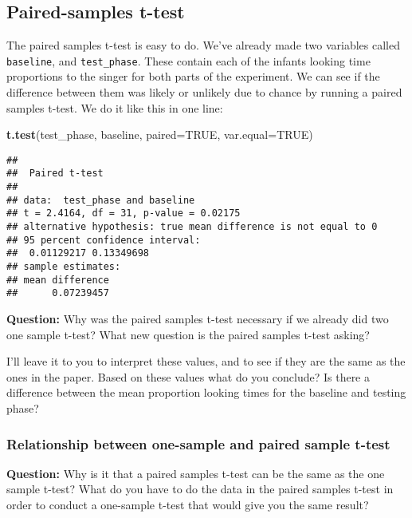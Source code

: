 \documentclass[
]{book}
\newenvironment{Shaded}{\begin{snugshade}}{\end{snugshade}}
\newcommand{\AttributeTok}[1]{\textcolor[rgb]{0.13,0.29,0.53}{#1}}
\newcommand{\ConstantTok}[1]{\textcolor[rgb]{0.56,0.35,0.01}{#1}}
\newcommand{\FunctionTok}[1]{\textcolor[rgb]{0.13,0.29,0.53}{\textbf{#1}}}
\newcommand{\NormalTok}[1]{#1}
\begin{document}
\hypertarget{paired-samples-t-test}{%
\subsection{Paired-samples t-test}\label{paired-samples-t-test}}

The paired samples t-test is easy to do. We've already made two variables called \texttt{baseline}, and \texttt{test\_phase}. These contain each of the infants looking time proportions to the singer for both parts of the experiment. We can see if the difference between them was likely or unlikely due to chance by running a paired samples t-test. We do it like this in one line:

\begin{Shaded}
\begin{Highlighting}[]
\FunctionTok{t.test}\NormalTok{(test\_phase, baseline, }\AttributeTok{paired=}\ConstantTok{TRUE}\NormalTok{, }\AttributeTok{var.equal=}\ConstantTok{TRUE}\NormalTok{)}
\end{Highlighting}
\end{Shaded}

\begin{verbatim}
## 
##  Paired t-test
## 
## data:  test_phase and baseline
## t = 2.4164, df = 31, p-value = 0.02175
## alternative hypothesis: true mean difference is not equal to 0
## 95 percent confidence interval:
##  0.01129217 0.13349698
## sample estimates:
## mean difference 
##      0.07239457
\end{verbatim}

\textbf{Question:} Why was the paired samples t-test necessary if we already did two one sample t-test? What new question is the paired samples t-test asking?

I'll leave it to you to interpret these values, and to see if they are the same as the ones in the paper. Based on these values what do you conclude? Is there a difference between the mean proportion looking times for the baseline and testing phase?

\hypertarget{relationship-between-one-sample-and-paired-sample-t-test}{%
\subsubsection{Relationship between one-sample and paired sample t-test}\label{relationship-between-one-sample-and-paired-sample-t-test}}

\textbf{Question:} Why is it that a paired samples t-test can be the same as the one sample t-test? What do you have to do the data in the paired samples t-test in order to conduct a one-sample t-test that would give you the same result?
\end{document}
